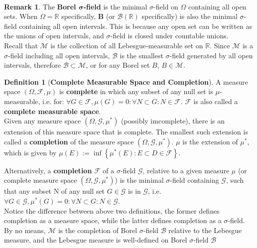 \documentclass[reqno]{amsart}
\theoremstyle{definition}
\newtheorem{definition}{Definition}
\newtheorem{remark}{Remark}{\normalfont}
\begin{document}
~\\
\begin{remark}
The \textbf{Borel $\mathbf{\sigma}$-field} is the minimal $\sigma$-field on $\Omega$ containing all open sets. When $\Omega = \mathbb{R}$ specifically, $\mathbf{B}$ (or $\mathcal{B}(\mathbb{R})$ specifically) is also the minimal $\sigma$-field containing all open intervals. This is because any open set can be written as the unions of open intervals, and  $\sigma$-field is closed under countable unions. 
~\\

Recall that $\mathcal{M}$ is the collection of all Lebesgue-measurable set on $\mathbb{R}$. Since $\mathcal{M}$ is a $\sigma$-field including all open intervals, $\mathcal{B}$ is the smallest $\sigma$-field generated by all open intervals, therefore $\mathcal{B} \subset \mathcal{M}$, or for any Borel set $B$, $B \in \mathcal{M}$.

\end{remark}
\newpage
\begin{definition}[\textbf{Complete Measurable Space and Completion}]{\mbox{}}

A measure space $\left(\Omega, \mathcal{F}, \mu \right)$ is \textbf{complete} in which any subset of any null set is $\mu$-measurable, i.e. $\mbox{for: }\forall G \in \mathcal{F}, \mu(G) = 0: \forall N \subset G: N \in \mathcal{F}$. $\mathcal{F}$ is also called a \textbf{complete measurable space}.
~\\

Given any measure space $\left( \Omega, \mathcal{G}, \mu^{*} \right)$ (possibly imcomplete), there is an extension of this measure space that is complete. The smallest such extension is called a \textbf{completion} of the measure space $\left( \Omega, \mathcal{G}, \mu^{*} \right)$. $\mu$ is the extension of $\mu^{*}$, which is given by $\mu(E):= \inf{\left\{ \mu^{*}(E): E \subset D \in \mathcal{F}\right\}}$.

Alternatively, a \textbf{completion} $\mathcal{F}$ of a $\sigma$-field $\mathcal{G}$, relative to a given measure $\mu$ (or complete measure space $\left( \Omega, \mathcal{G}, \mu^{*} \right)$) is the minimal $\sigma$-field containing $\mathcal{G}$, such that any subset N of any null set $G \in \mathcal{G}$ is in $\mathcal{G}$, i.e. $\forall G \in \mathcal{G}, \mu^{*}(G)= 0: \forall N \subset G: N \in \mathcal{G}$. 
~\\

Notice the difference between above two definitions, the former defines completion as a measure space, while the latter defines completion as a $\sigma$-field. By no means, $\mathcal{M}$ is the completion of Borel $\sigma$-field $\mathcal{B}$ relative to the Lebesgue measure, and the Lebesgue measure is well-defined on Borel $\sigma$-field $\mathcal{B}$
\end{definition}
~\\
\end{document}
